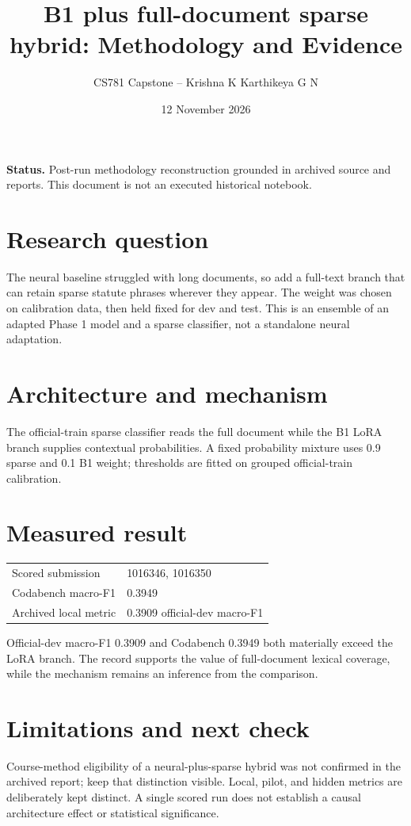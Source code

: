 \documentclass[11pt,a4paper]{article}
\title{B1 plus full-document sparse hybrid: Methodology and Evidence}
\author{CS781 Capstone -- Krishna K Karthikeya G N}
\date{12 November 2026}
\begin{document}
\maketitle
\noindent\textbf{Status.} Post-run methodology reconstruction grounded in archived source and reports. This document is not an executed historical notebook.\par
\section*{Research question}
The neural baseline struggled with long documents, so add a full-text branch that can retain sparse statute phrases wherever they appear. The weight was chosen on calibration data, then held fixed for dev and test. This is an ensemble of an adapted Phase 1 model and a sparse classifier, not a standalone neural adaptation.
\section*{Architecture and mechanism}
The official-train sparse classifier reads the full document while the B1 LoRA branch supplies contextual probabilities. A fixed probability mixture uses 0.9 sparse and 0.1 B1 weight; thresholds are fitted on grouped official-train calibration.
\section*{Measured result}
\begin{center}\begin{tabular}{ll}Scored submission & 1016346, 1016350\\
Codabench macro-F1 & 0.3949\\
Archived local metric & 0.3909 official-dev macro-F1\end{tabular}\end{center}
Official-dev macro-F1 0.3909 and Codabench 0.3949 both materially exceed the LoRA branch. The record supports the value of full-document lexical coverage, while the mechanism remains an inference from the comparison.
\section*{Limitations and next check}
Course-method eligibility of a neural-plus-sparse hybrid was not confirmed in the archived report; keep that distinction visible. Local, pilot, and hidden metrics are deliberately kept distinct. A single scored run does not establish a causal architecture effect or statistical significance.
\end{document}

